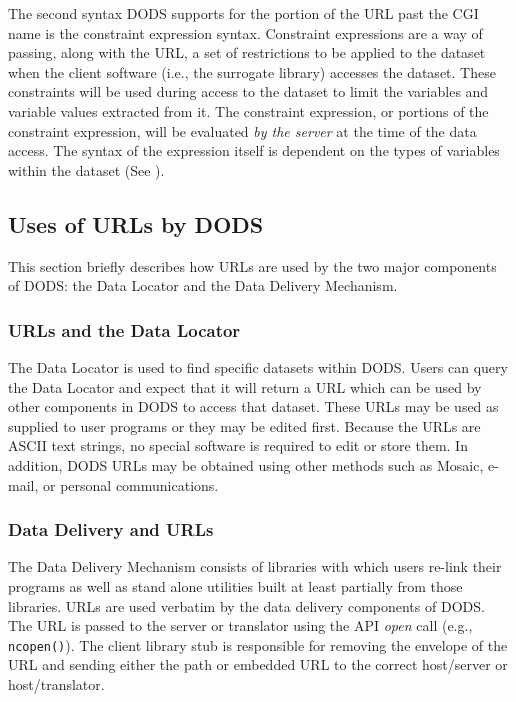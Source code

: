 The second syntax DODS supports for the portion of the URL past the
CGI name is the constraint expression syntax. Constraint expressions
are a way of passing, along with the URL, a set of restrictions to be
applied to the dataset when the client software (i.e., the surrogate
library) accesses the dataset. These constraints will be used during
access to the dataset to limit the variables and variable values
extracted from it. The constraint expression, or portions of the
constraint expression, will be evaluated {\em by the server\/} at the
time of the data access. The syntax of the expression itself is
dependent on the types of variables within the dataset (See \DTP).

\subsection{Uses of URLs by DODS}

This section briefly describes how URLs are used by the two major components
of DODS: the Data Locator and the Data Delivery Mechanism.

\subsubsection{URLs and the Data Locator}
\label{url:locator}

The Data Locator is used to find specific datasets within DODS\@. Users can
query the Data Locator and expect that it will return a URL which can be used
by other components in DODS to access that dataset. These URLs may be used
as supplied to user programs or they may be edited first. Because the URLs
are ASCII text strings, no special software is required to edit or store
them. In addition, DODS URLs may be obtained using other methods such as
Mosaic, e-mail, or personal communications.

\subsubsection{Data Delivery and URLs}
\label{delivery}
\label{urls:user-vs-generated}

The Data Delivery Mechanism consists of libraries with which users re-link
their programs as well as stand alone utilities built at least partially from
those libraries. URLs are used verbatim by the data delivery components of
DODS\@. The URL is passed to the server or translator using the API {\em
  open\/} call (e.g., {\tt ncopen()}). The client library stub is responsible
for removing the envelope of the URL and sending either the path or embedded
URL to the correct host/server or host/translator.


